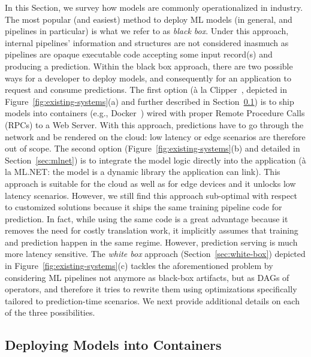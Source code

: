 \documentclass[11pt]{article}
\newcommand{\mlnet}{ML.NET\xspace}
\begin{document}
In this Section, we survey how models are commonly operationalized in industry. 
The most popular (and easiest) method to deploy ML models (in general, and pipelines in particular) is what we refer to as \emph{black box}. 
Under this approach, internal pipelines' information and structures are not considered inasmuch as pipelines are opaque executable code accepting some input record(s) and producing a prediction.
Within the black box approach, there are two possible ways for a developer to deploy models, and consequently for an application to request and consume predictions.
The first option (\`a la Clipper~\cite{clipper}, depicted in Figure~\ref{fig:existing-systems}(a) and further described in Section~\ref{sec:clipper}) is to ship models into containers (e.g., Docker~\cite{docker}) wired with proper Remote Procedure Calls (RPCs) to a Web Server.
With this approach, predictions have to go through the network and be rendered on the cloud: low latency or edge scenarios are therefore out of scope.
The second option (Figure~\ref{fig:existing-systems}(b) and detailed in Section~\ref{sec:mlnet}) is to integrate the model logic directly into the application (\`a la \mlnet: the model is a dynamic library the application can link).
This approach is suitable for the cloud as well as for edge devices and it unlocks low latency scenarios. 
However, we still find this approach sub-optimal with respect to customized solutions because it ships the same training pipeline code for prediction. In fact, while using the same code is a great advantage because it removes the need for costly translation work, it implicitly assumes that training and prediction happen in the same regime. However, prediction serving is much more latency sensitive.
The \emph{white box} approach (Section~\ref{sec:white-box}) depicted in Figure~\ref{fig:existing-systems}(c) tackles the aforementioned problem by considering ML pipelines not anymore as black-box artifacts, but as DAGs of operators, and therefore it tries to rewrite them using optimizations specifically tailored to prediction-time scenarios.
We next provide additional details on each of the three possibilities. 

\subsection{Deploying Models into Containers}
\label{sec:clipper}
\end{document}
